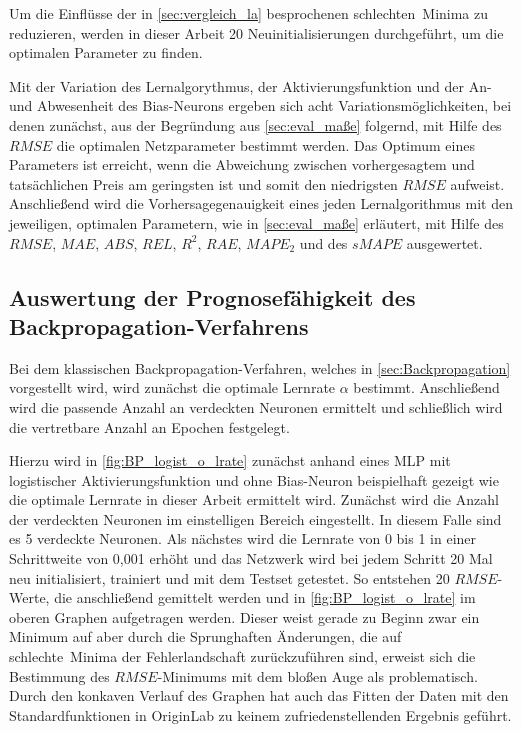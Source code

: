 Um die Einflüsse der in \autoref{sec:vergleich_la} besprochenen \glqq schlechten\grqq~Minima zu reduzieren, werden in dieser Arbeit 20 Neuinitialisierungen durchgeführt, um die optimalen Parameter zu finden.

Mit der Variation des Lernalgorythmus, der Aktivierungsfunktion und der An- und Abwesenheit des Bias-Neurons ergeben sich acht Variationsmöglichkeiten, bei denen zunächst, aus der Begründung aus \autoref{sec:eval_maße} folgernd, mit Hilfe des $RMSE$ die optimalen Netzparameter bestimmt werden. Das Optimum eines Parameters ist erreicht, wenn die Abweichung zwischen vorhergesagtem und tatsächlichen Preis am geringsten ist und somit den niedrigsten $RMSE$ aufweist. Anschließend wird die Vorhersagegenauigkeit eines jeden Lernalgorithmus mit den jeweiligen, optimalen Parametern, wie in \autoref{sec:eval_maße} erläutert, mit Hilfe des $RMSE$, $MAE$, $ABS$, $REL$, $R^2$, $RAE$, $MAPE_2$ und des $sMAPE$ ausgewertet.




\subsection{Auswertung der Prognosefähigkeit des Backpropagation-Verfahrens}\label{sec:aus_backprop}

Bei dem klassischen Backpropagation-Verfahren, welches in \autoref{sec:Backpropagation} vorgestellt wird, wird zunächst die optimale Lernrate $\alpha$ bestimmt. Anschließend wird die passende Anzahl an verdeckten Neuronen ermittelt und schließlich wird die vertretbare Anzahl an Epochen festgelegt.

Hierzu wird in \autoref{fig:BP_logist_o_lrate} zunächst anhand eines MLP mit logistischer Aktivierungsfunktion und ohne Bias-Neuron beispielhaft gezeigt wie die optimale Lernrate in dieser Arbeit ermittelt wird. Zunächst wird die Anzahl der verdeckten Neuronen im einstelligen Bereich eingestellt. In diesem Falle sind es 5 verdeckte Neuronen. Als nächstes wird die Lernrate von 0 bis 1 in einer Schrittweite von 0,001 erhöht und das Netzwerk wird bei jedem Schritt 20 Mal neu initialisiert, trainiert und mit dem Testset getestet. So entstehen 20 $RMSE$-Werte, die anschließend gemittelt werden und in \autoref{fig:BP_logist_o_lrate} im oberen Graphen aufgetragen werden. Dieser weist gerade zu Beginn zwar ein Minimum auf aber durch die Sprunghaften Änderungen, die auf \glqq schlechte\grqq~Minima der Fehlerlandschaft zurückzuführen sind, erweist sich die Bestimmung des $RMSE$-Minimums mit dem bloßen Auge als problematisch. Durch den konkaven Verlauf des Graphen hat auch das Fitten der Daten mit den Standardfunktionen in OriginLab zu keinem zufriedenstellenden Ergebnis geführt.

